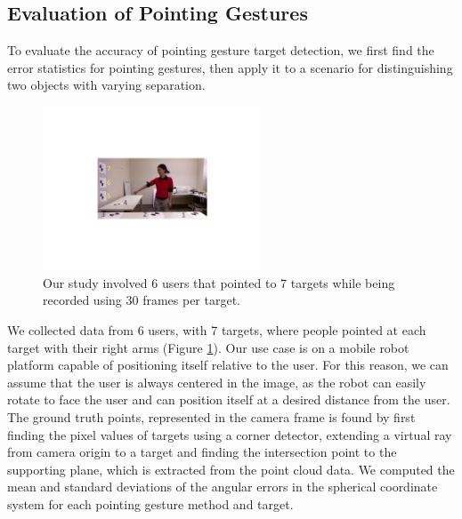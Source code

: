 \documentclass{tADR2e}
\begin{document}
\subsection{Evaluation of Pointing Gestures}
\label{sec:eval_pointing_gestures}

To evaluate the accuracy of pointing gesture target detection, we first find the error statistics for pointing gestures, then apply it to a scenario for distinguishing two objects with varying separation.

\begin{figure}[thpb]
\centering
\includegraphics[width=65mm]{pics/data_collection_crop}
\caption{Our study involved 6 users that pointed to 7 targets while being recorded using 30 frames per target.}
\label{fig:ground_truth_targets}
\end{figure}

We collected data from 6 users, with 7 targets, where people pointed at each target with their right arms (Figure \ref{fig:ground_truth_targets}). Our use case is on a mobile robot platform capable of positioning itself relative to the user.  For this reason, we can assume that the user is always centered in the image, as the robot can easily rotate to face the user and can position itself at a desired distance from the user. The ground truth points, represented in the camera frame is found by first finding the pixel values of targets using a corner detector, extending a virtual ray from camera origin to a target and finding the intersection point to the supporting plane, which is extracted from the point cloud data. We computed the mean and standard deviations of the angular errors in the spherical coordinate system for each pointing gesture method and target. 
\end{document}
